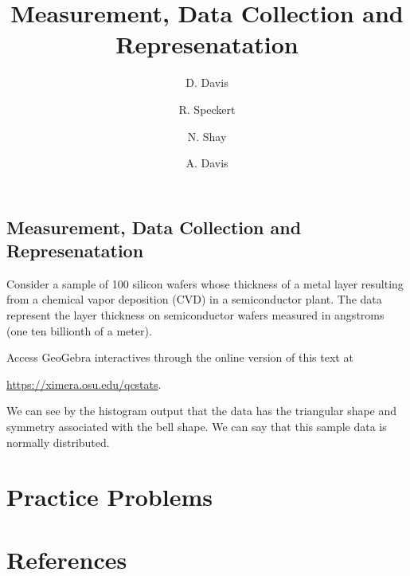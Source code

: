 \documentclass{ximera}
\author{D. Davis \and R. Speckert \and N. Shay \and A. Davis}
\title{Measurement, Data Collection and Represenatation} \license{CC BY-NC-SA 4.0}
\begin{document}
\begin{abstract}
\end{abstract}
\maketitle

\begin{onlineOnly}
\section*{Measurement, Data Collection and Represenatation}
\end{onlineOnly}

\begin{exploration}\label{exp:histogram1}
Consider a sample of 100 silicon wafers whose thickness of a metal layer resulting from a chemical vapor deposition (CVD) in a semiconductor plant. The data represent the layer thickness on semiconductor wafers measured in angstroms (one ten billionth of a meter).

\begin{pdfOnly}
Access GeoGebra interactives through the online version of this text at 

\href{https://ximera.osu.edu/qcstats}{https://ximera.osu.edu/qcstats}.
\end{pdfOnly}

\begin{onlineOnly}
\begin{center} 
\end{center}
\end{onlineOnly}

We can see by the histogram output that the data has the triangular shape and symmetry associated with the bell shape. We can say that this sample data is normally distributed.


\end{exploration}


\section*{Practice Problems}

\section*{References}
\end{document}
